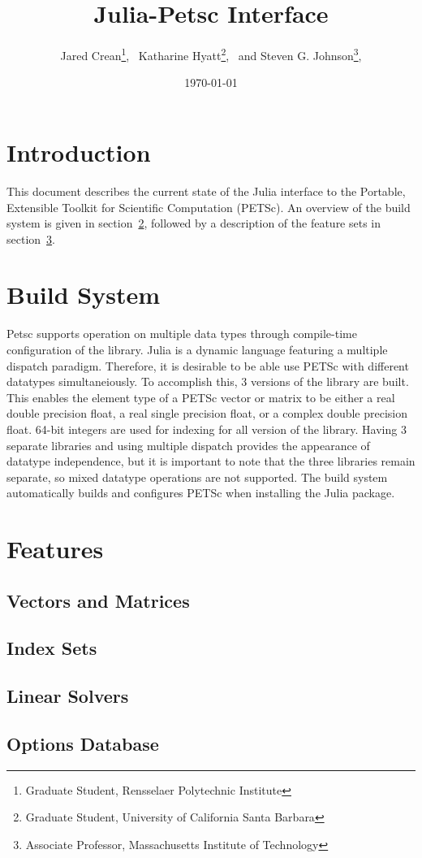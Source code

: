 \documentclass{article}
\title{Julia-Petsc Interface}
\author{
  Jared Crean\thanks{Graduate Student, Rensselaer Polytechnic Institute}, \
  Katharine Hyatt\thanks{Graduate Student, University of California Santa Barbara}, \ and
  Steven G. Johnson\thanks{Associate Professor, Massachusetts Institute of Technology},
}
\date{\today}
\begin{document}
\maketitle

\section{Introduction} \label{sec:intro}
This document describes the current state of the Julia interface to the Portable, Extensible Toolkit for Scientific Computation (PETSc).  An overview of the build system is given in section~\ref{sec:build}, followed by a description of the  feature sets in section~\ref{sec:features}.

\section{Build System} \label{sec:build}
Petsc supports operation on multiple data types through compile-time configuration of the library.
Julia is a dynamic language featuring a multiple dispatch paradigm.
Therefore, it is desirable to be able use PETSc with different datatypes simultaneiously. 
To accomplish this, 3 versions of the library are built.
This enables the element type of a PETSc vector or matrix to be either  a real double precision float, a real single precision float, or a complex double precision float.
64-bit integers are used for indexing for all version of the library.
Having 3 separate libraries and using multiple dispatch provides the appearance of datatype independence, but it is important to note that the three libraries remain separate, so mixed datatype operations are not supported.
The build system automatically builds and configures PETSc when installing the Julia package.


\section{Features} \label{sec:features}

\subsection{Vectors and Matrices} \label{sec:arrays}

\subsection{Index Sets} \label{sec:is}

\subsection{Linear Solvers} \label{sec:ksp}

\subsection{Options Database} \label{sec:options}
\end{document}
